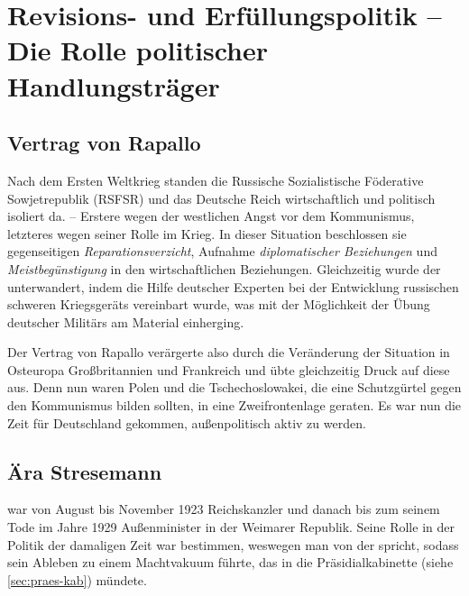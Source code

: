 \section[Revisions- und Erfüllungspolitik -- Die Rolle politischer
Handlungsträger]{Revisions- und Erfüllungspolitik -- Die Rolle
politischer
Handlungsträger\,\,}
\label{sec:rev-erf-pol}

\subsection*{Vertrag von Rapallo}

Nach dem Ersten Weltkrieg standen die Russische Sozialistische
Föderative Sowjetrepublik (RSFSR) und das Deutsche Reich
wirtschaftlich und politisch isoliert da. -- Erstere wegen der
westlichen Angst vor dem Kommunismus, letzteres wegen seiner Rolle im
Krieg. In dieser Situation beschlossen sie  gegenseitigen 
\emph{Reparationsverzicht}, Aufnahme
\emph{diplomatischer Beziehungen} und
\emph{Meistbegünstigung} in den
wirtschaftlichen Beziehungen. Gleichzeitig wurde der  unterwandert, indem die Hilfe deutscher Experten bei der
Entwicklung russischen schweren Kriegsgeräts vereinbart wurde, was mit
der Möglichkeit der Übung deutscher Militärs am Material einherging.

Der Vertrag von Rapallo verärgerte also durch die Veränderung der
Situation in Osteuropa Großbritannien und Frankreich und übte
gleichzeitig Druck auf diese aus. Denn nun waren Polen und die
Tschechoslowakei, die eine Schutzgürtel gegen den Kommunismus bilden
sollten, in eine Zweifrontenlage geraten. Es war nun die Zeit für
Deutschland gekommen, außenpolitisch aktiv zu werden.


\subsection*{Ära Stresemann}

 war von August bis
November 1923 Reichskanzler und danach bis zum seinem Tode im Jahre
1929 Außenminister in der Weimarer Republik. Seine Rolle in der
Politik der damaligen Zeit war bestimmen, weswegen man von der
 spricht, sodass sein Ableben zu einem Machtvakuum
führte, das in die Präsidialkabinette (siehe \ref{sec:praes-kab})
mündete.

